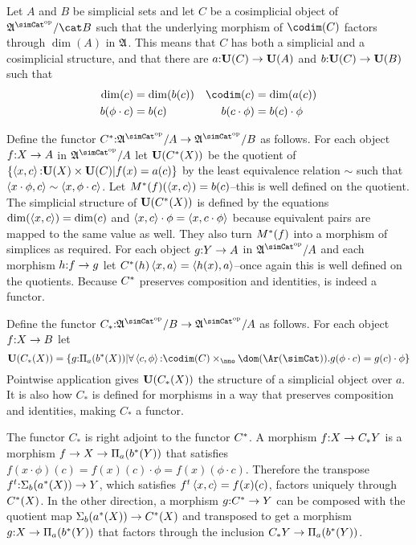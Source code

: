 \documentclass[csh.tex]{subfiles}
\begin{document}
\begin{definition} Let $A$ and $B$ be simplicial sets and let $C$ be a cosimplicial object of $\ambient\s/\cat B$ such that the underlying morphism of $\codim(C)$ factors through $\dim(A)$ in $\mathfrak A$. This means that $C$ has both a simplicial and a cosimplicial structure, and that
there are $a\mathord :\mathbf{U}(C)\to\mathbf{U}(A)$ and $b\mathord :\mathbf{U}(C)\to\mathbf{U}(B)$ such that 
\begin{align*}
\dim(c) &= \dim(b(c)) & \codim(c) &= \dim(a(c))\\b(\phi\cdot c) &= b(c) & b(c\cdot\phi)&=b(c)\cdot\phi\\
\end{align*}

Define the functor $C\ri\of\ambient\s/A\to \ambient\s/B$ as follows. For each object $f\mathord : X\to A$ in $\ambient \s/A$ let $\mathbf{U}(C^*(X))$ be the quotient of $\left\{\left\langle x,c \right\rangle\mathord : \mathbf{U}(X)\times \mathbf{U}(C)| f(x)=a(c) \right\}$ by the least equivalence relation $\sim$ such that $\left\langle x\cdot\phi,c \right\rangle\sim\left\langle x,\phi\cdot c \right\rangle$. Let $M^*(f)(\left\langle x,c \right\rangle) = b(c)$--this is well defined on the quotient. 
The simplicial structure of $\mathbf{U}(C^*(X))$ is defined by the equations $\dim(\left\langle x,c \right\rangle) = \dim(c)$ and $\left\langle x,c \right\rangle\cdot \phi = \left\langle x,c\cdot\phi \right\rangle$ because equivalent pairs are mapped to the same value as well. They also turn $M^*(f)$ into a morphism of simplices as required. For each object $g\mathord : Y\to A$ in $\ambient \s/A$ and each morphism $h\mathord : f\to g$ let $C^*(h)\left\langle x,a \right\rangle = \left\langle h(x),a \right\rangle$--once again this is well defined on the quotients. Because $C^*$ preserves composition and identities, is indeed a functor.

Define the functor $C_*\of\ambient\s/B\to \ambient\s/A$ as follows. For each object $f\mathord : X\to B$ let 
\[ \base(C_*(X)) = \set{g\of \dprod a(b\ri(X)) | \forall \tuplet{c,\phi}\of\codim(C)\times_\nno\dom(\Ar(\simCat)).g(\phi\cdot c)= g(c)\cdot \phi }\]
Pointwise application gives $\mathbf{U}(C_*(X))$ the structure of a simplicial object over $a$. It is also how $C_*$ is defined for morphisms in a way that preserves composition and identities, making $C_*$ a functor.

The functor $C_*$ is right adjoint to the functor $C^*$. 
A morphism $f\mathord : X\to C_*Y$ is a morphism $f\to X \to \Pi_{a}(b^*(Y))$ that satisfies $f(x\cdot\phi)(c) = f(x)(c)\cdot\phi = f(x)(\phi\cdot c)$. Therefore the transpose $f^t\mathord : \Sigma_{b}(a^*(X)) \to Y$, which satisfies $f^t\left\langle x,c \right\rangle = f(x)(c)$, factors uniquely through $C^*(X)$. In the other direction, a morphism $g\mathord : C^*\to Y$ can be composed with the quotient map $\Sigma_{b}(a^*(X)) \to C^*(X)$ and transposed to get a morphism $g\mathord : X \to \Pi_{a}(b^*(Y))$ that factors through the inclusion $C_*Y\to \Pi_{a}(b^*(Y))$. 
\end{definition}
\end{document}
